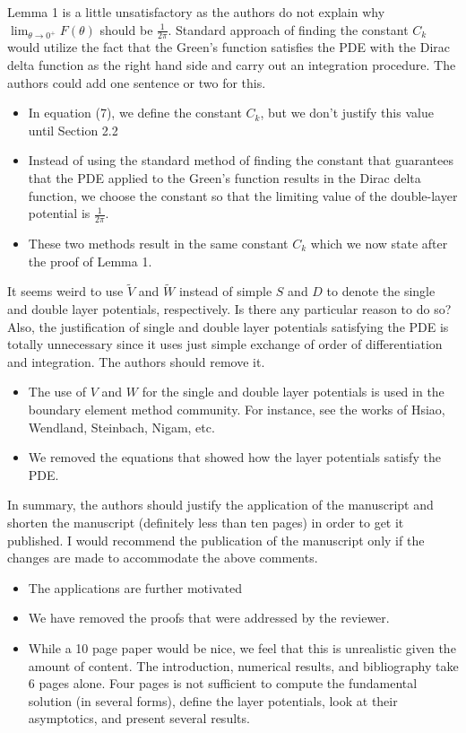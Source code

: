 \documentclass[11pt]{article}
\newcommand{\comment}[1]{{\color{blue} #1}}
\begin{document}
\comment{Lemma 1 is a little unsatisfactory as the authors do not
explain why $\lim_{\theta \rightarrow 0^{+}}F(\theta)$ should be
$\frac{1}{2\pi}$.  Standard approach of finding the constant $C_{k}$
would utilize the fact that the Green’s function satisfies the PDE with
the Dirac delta function as the right hand side and carry out an
integration procedure. The authors could add one sentence or two for
this.}
\begin{itemize}
  \item In equation (7), we define the constant $C_{k}$, but we don't
  justify this value until Section 2.2
  \item Instead of using the standard method of finding the constant
  that guarantees that the PDE applied to the Green's function results
  in the Dirac delta function, we choose the constant so that the
  limiting value of the double-layer potential is $\frac{1}{2\pi}$.
  \item These two methods result in the same constant $C_{k}$ which we
  now state after the proof of Lemma 1.
\end{itemize}

\comment{It seems weird to use $\tilde{V}$ and $\tilde{W}$ instead of
simple $S$ and $D$ to denote the single and double layer potentials,
respectively. Is there any particular reason to do so?  Also, the
justification of single and double layer potentials satisfying the PDE
is totally unnecessary since it uses just simple exchange of order of
differentiation and integration.  The authors should remove it.}
\begin{itemize}
  \item The use of $V$ and $W$ for the single and double layer
  potentials is used in the boundary element method community.  For
  instance, see the works of Hsiao, Wendland, Steinbach, Nigam, etc.
  \item We removed the equations that showed how the layer potentials
  satisfy the PDE.
\end{itemize}

\comment{In summary, the authors should justify the application of the
manuscript and shorten the manuscript (definitely less than ten pages)
in order to get it published. I would recommend the publication of the
manuscript only if the changes are made to accommodate the above
comments.}
\begin{itemize}
  \item The applications are further motivated
  \item We have removed the proofs that were addressed by the reviewer.
  \item While a 10 page paper would be nice, we feel that this is
  unrealistic given the amount of content.  The introduction, numerical
  results, and bibliography take 6 pages alone.  Four pages is not
  sufficient to compute the fundamental solution (in several forms),
  define the layer potentials,  look at their asymptotics, and present
  several results.
\end{itemize}
\end{document}
